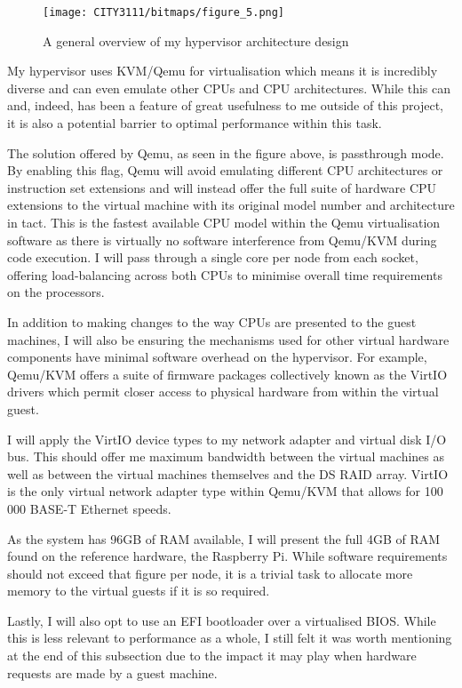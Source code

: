 \begin{figure}[H]
    \texttt{[image: CITY3111/bitmaps/figure\_5.png]}
    \caption{A general overview of my hypervisor architecture design}
    \label{figure_5}
\end{figure}

My hypervisor uses KVM/Qemu for virtualisation which means it is incredibly diverse and can even emulate other CPUs and CPU architectures. While this can and, indeed, has been a feature of great usefulness to me outside of this project, it is also a potential barrier to optimal performance within this task.

The solution offered by Qemu, as seen in the figure above, is passthrough mode. By enabling this flag, Qemu will avoid emulating different CPU architectures or instruction set extensions and will instead offer the full suite of hardware CPU extensions to the virtual machine with its original model number and architecture in tact. This is the fastest available CPU model within the Qemu virtualisation software as there is virtually no software interference from Qemu/KVM during code execution. I will pass through a single core per node from each socket, offering load-balancing across both CPUs to minimise overall time requirements on the processors.

In addition to making changes to the way CPUs are presented to the guest machines, I will also be ensuring the mechanisms used for other virtual hardware components have minimal software overhead on the hypervisor. For example, Qemu/KVM offers a suite of firmware packages collectively known as the VirtIO drivers \cite{ova_2020} which permit closer access to physical hardware from within the virtual guest.

I will apply the VirtIO device types to my network adapter and virtual disk I/O bus. This should offer me maximum bandwidth between the virtual machines as well as between the virtual machines themselves and the DS RAID array. VirtIO is the only virtual network adapter type within Qemu/KVM that allows for 100 000 BASE-T Ethernet speeds.

As the system has 96GB of RAM available, I will present the full 4GB of RAM found on the reference hardware, the Raspberry Pi. While software requirements should not exceed that figure per node, it is a trivial task to allocate more memory to the virtual guests if it is so required.

Lastly, I will also opt to use an EFI bootloader over a virtualised BIOS. While this is less relevant to performance as a whole, I still felt it was worth mentioning at the end of this subsection due to the impact it may play when hardware requests are made by a guest machine.

